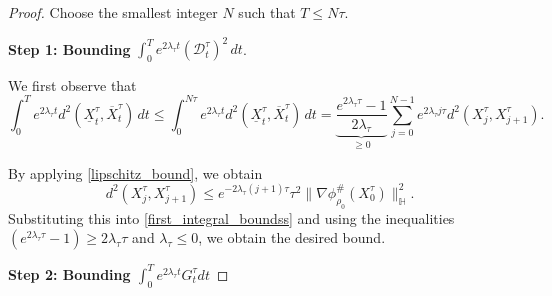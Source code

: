 \documentclass[10pt,a4paper]{amsart}
\begin{document}
\begin{proof}

Choose the smallest integer $N$ such that $T \leq N \tau$. \smallskip 

\noindent \textbf{Step 1: Bounding } $\displaystyle \int_0^T e^{2 \lambda_{\tau} t} (\mathcal{D}_t^{\tau})^2\,dt$.

We first observe that
\begin{equation}
\int_0^T e^{2\lambda_{\tau} t} d^2(\underline{X}_t^{\tau},\overline{X}^{\tau}_t)\,dt 
\leq \int_0^{N \tau} e^{2\lambda_{\tau} t} d^2(\underline{X}_t^{\tau},\overline{X}^{\tau}_t)\,dt 
= \underbrace{\frac{e^{2\lambda_{\tau} \tau} - 1}{2 \lambda_{\tau}}}_{\geq 0} \sum_{j=0}^{N-1} e^{2 \lambda_{\tau} j \tau} d^2(X^{\tau}_j,X^{\tau}_{j+1}).
\label{first_integral_boundss}
\end{equation} 

\noindent By applying \eqref{lipschitz_bound}, we obtain
\begin{equation}
d^2(X^{\tau}_j,X^{\tau}_{j+1}) \leq e^{-2\lambda_{\tau} (j+1) \tau} \tau^2 \|\nabla \phi^{\#}_{\rho_0}(X_0^{\tau})\|^2_{\mathbb{H}}. \label{distance_bounds123}
\end{equation}
Substituting this into \eqref{first_integral_boundss} and using the inequalities $(e^{2 \lambda_{\tau} \tau} - 1) \geq 2\lambda_{\tau} \tau$ and $\lambda_{\tau} \leq 0$, we obtain the desired bound. \smallskip

\noindent \textbf{Step 2: Bounding $\int_0^T e^{2 \lambda_{\tau}t} G^{\tau}_t dt$}  \smallskip


\end{proof}
\end{document}
